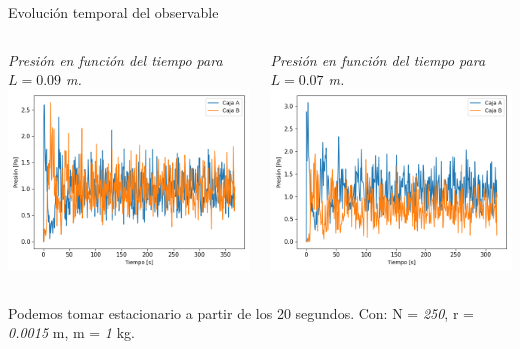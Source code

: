 \documentclass{beamer}
\begin{document}
\begin{frame}{Evolución temporal del observable}
  \begin{columns}
    \begin{column}{0.5\textwidth}
      \tiny \textit{Presión en función del tiempo para $L = \textit{0.09}$ m.}
      \includegraphics[width=\linewidth]{photoMaterial/PvT_09.png}
    \end{column}
    \begin{column}{0.5\textwidth}
      \tiny \textit{Presión en función del tiempo para $L = \textit{0.07}$ m.}
      \includegraphics[width=\linewidth]{photoMaterial/PvT_07.png}
    \end{column}
    \end{columns}
    \tiny Podemos tomar estacionario a partir de los 20 segundos.
    \tiny Con: N = \textit{250}, r = \textit{0.0015} m, m = \textit{1} kg.
\end{frame}
\end{document}
